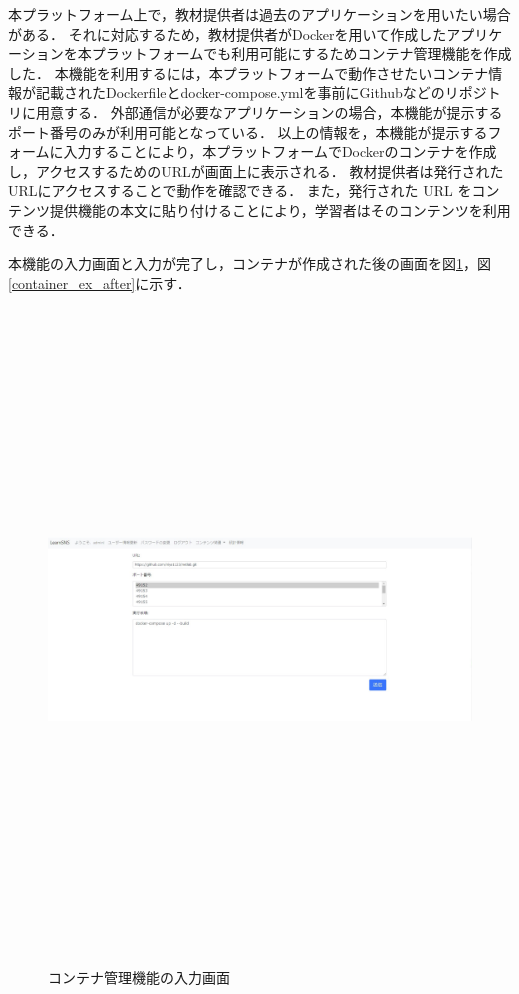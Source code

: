 本プラットフォーム上で，教材提供者は過去のアプリケーションを用いたい場合がある．
それに対応するため，教材提供者がDockerを用いて作成したアプリケーションを本プラットフォームでも利用可能にするためコンテナ管理機能を作成した．
本機能を利用するには，本プラットフォームで動作させたいコンテナ情報が記載されたDockerfileとdocker-compose.ymlを事前にGithubなどのリポジトリに用意する．
外部通信が必要なアプリケーションの場合，本機能が提示するポート番号のみが利用可能となっている．
以上の情報を，本機能が提示するフォームに入力することにより，本プラットフォームでDockerのコンテナを作成し，アクセスするためのURLが画面上に表示される．
教材提供者は発行されたURLにアクセスすることで動作を確認できる．
また，発行された URL をコンテンツ提供機能の本文に貼り付けることにより，学習者はそのコンテンツを利用できる．

本機能の入力画面と入力が完了し，コンテナが作成された後の画面を図\ref{container_ex_before}，図\ref{container_ex_after}に示す．

\begin{figure}[htbp]
    \begin{center}
        \includegraphics[width=18cm,height=17cm,keepaspectratio]{container_before-crop.pdf}\\
    \end{center}
    \caption{コンテナ管理機能の入力画面}
    \label{container_ex_before}
\end{figure}

